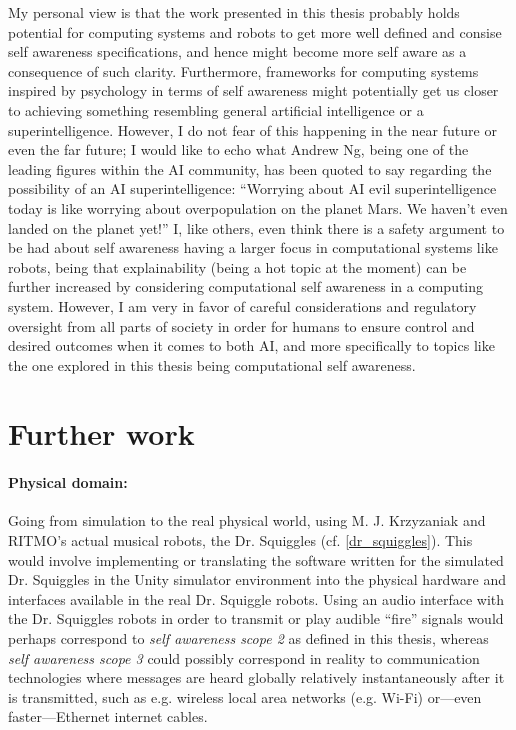 	My personal view is that the work presented in this thesis probably holds potential for computing systems and robots to get more well defined and consise self awareness specifications, and hence might become more self aware as a consequence of such clarity. Furthermore, frameworks for computing systems inspired by psychology in terms of self awareness might potentially get us closer to achieving something resembling general artificial intelligence or a superintelligence. However, I do not fear of this happening in the near future or even the far future; I would like to echo what Andrew Ng, being one of the leading figures within the AI community, has been quoted to say regarding the possibility of an AI superintelligence: ``Worrying about AI evil superintelligence today is like worrying about overpopulation on the planet Mars. We haven’t even landed on the planet yet!'' I, like others, even think there is a safety argument to be had about self awareness having a larger focus in computational systems like robots, being that explainability (being a hot topic at the moment) can be further increased by considering computational self awareness in a computing system. However, I am very in favor of careful considerations and regulatory oversight from all parts of society in order for humans to ensure control and desired outcomes when it comes to both AI, and more specifically to topics like the one explored in this thesis being computational self awareness.


\section{Further work}

	\paragraph{Physical domain:}
	Going from simulation to the real physical world, using M. J. Krzyzaniak and RITMO's  actual musical robots, the Dr. Squiggles (cf. \ref{dr_squiggles}). This would involve implementing or translating the software written for the simulated Dr. Squiggles in the Unity simulator environment into the physical hardware and interfaces available in the real Dr. Squiggle robots. Using an audio interface with the Dr. Squiggles robots in order to transmit or play audible ``fire'' signals would perhaps correspond to \textit{self awareness scope 2} as defined in this thesis, whereas \textit{self awareness scope 3} could possibly correspond in reality to communication technologies where messages are heard globally relatively instantaneously after it is transmitted, such as e.g. wireless local area networks (e.g. Wi-Fi) or—even faster—Ethernet internet cables.

